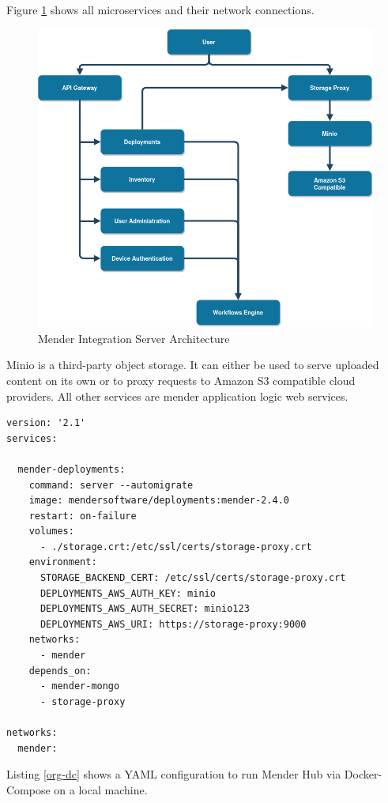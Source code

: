 Figure \ref{fig:mender-integration} shows all microservices and their network connections.
\begin{figure}
    \centering
    \includegraphics[scale=0.5]{images/integration-app.png}
    \caption{Mender Integration Server Architecture}
    \label{fig:mender-integration}
\end{figure}
Minio is a third-party object storage. It can either be used to serve uploaded content on its own or to proxy requests to Amazon S3 compatible cloud providers. All other services are mender application logic web services.
\newpage

\begin{code}
  \label{org-dc}
  \begin{verbatim}
version: '2.1'
services:

  mender-deployments:
    command: server --automigrate
    image: mendersoftware/deployments:mender-2.4.0
    restart: on-failure
    volumes:
      - ./storage.crt:/etc/ssl/certs/storage-proxy.crt
    environment:
      STORAGE_BACKEND_CERT: /etc/ssl/certs/storage-proxy.crt
      DEPLOYMENTS_AWS_AUTH_KEY: minio
      DEPLOYMENTS_AWS_AUTH_SECRET: minio123
      DEPLOYMENTS_AWS_URI: https://storage-proxy:9000
    networks:
      - mender
    depends_on:
      - mender-mongo
      - storage-proxy

networks:
  mender:
  \end{verbatim}
\end{code}
Listing \ref{org-dc} shows a YAML configuration to run Mender Hub via Docker-Compose on a local machine.
